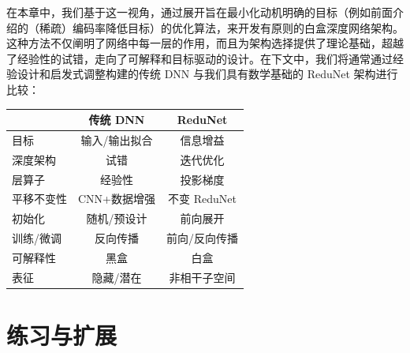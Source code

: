 \documentclass[../../book-main_zh.tex]{subfiles}
\begin{document}
在本章中，我们基于这一视角，通过展开旨在最小化动机明确的目标（例如前面介绍的（稀疏）编码率降低目标）的优化算法，来开发有原则的白盒深度网络架构。这种方法不仅阐明了网络中每一层的作用，而且为架构选择提供了理论基础，超越了经验性的试错，走向了可解释和目标驱动的设计。在下文中，我们将通常通过经验设计和启发式调整构建的传统 DNN 与我们具有数学基础的 ReduNet 架构进行比较：

\begin{center}
    \begin{tabular}{| l || c | c |}
        \hline
        & 传统 DNN & ReduNet\\ [0.5ex]
        \hline \hline
        目标 & 输入/输出拟合 & 信息增益\\ [0.5ex]
        \hline
        深度架构 & 试错 & 迭代优化 \\  [0.5ex]
        \hline
        层算子 & 经验性 & 投影梯度 \\  [0.5ex]
        \hline
        平移不变性 & CNN+数据增强 & 不变 ReduNet \\  [0.5ex]
        \hline
        初始化 & 随机/预设计 & 前向展开 \\ [0.5ex]
        \hline
        训练/微调 & 反向传播 & 前向/反向传播\\ [0.5ex]
        \hline
        可解释性 & 黑盒 & 白盒 \\ [0.5ex]
        \hline
        表征 & 隐藏/潜在 & 非相干子空间 \\ [0.5ex]
        \hline
    \end{tabular}
\end{center}

\section{练习与扩展}
\end{document}
